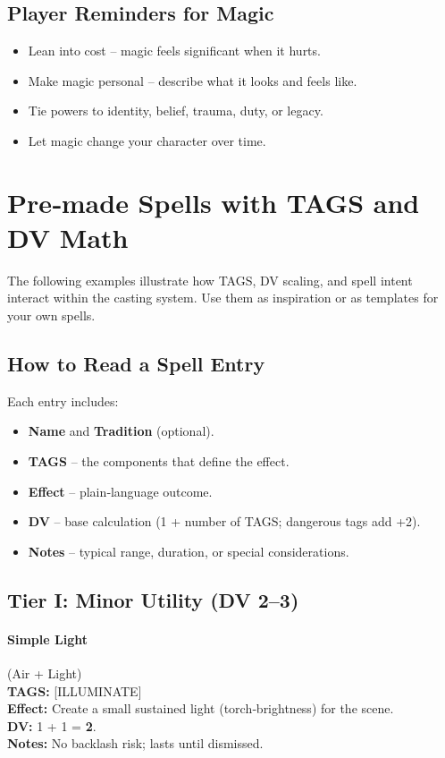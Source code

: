 \subsection{Player Reminders for Magic}
\begin{itemize}
    \item Lean into cost -- magic feels significant when it hurts.
    \item Make magic personal -- describe what it looks and feels like.
    \item Tie powers to identity, belief, trauma, duty, or legacy.
    \item Let magic change your character over time.
\end{itemize}

\clearpage

\section{Pre‑made Spells with TAGS and DV Math}
\label{app:spell-examples}

The following examples illustrate how TAGS, DV scaling, and spell intent interact within the casting system. Use them as inspiration or as templates for your own spells.

\subsection{How to Read a Spell Entry}
Each entry includes:
\begin{itemize}
  \item \textbf{Name} and \textbf{Tradition} (optional).
  \item \textbf{TAGS} -- the components that define the effect.
  \item \textbf{Effect} -- plain‑language outcome.
  \item \textbf{DV} -- base calculation (1 + number of TAGS; dangerous tags add +2).
  \item \textbf{Notes} -- typical range, duration, or special considerations.
\end{itemize}

\subsection{Tier I: Minor Utility (DV 2--3)}

\paragraph{Simple Light} (Air + Light) \\
\textbf{TAGS:} {[ILLUMINATE]} \\
\textbf{Effect:} Create a small sustained light (torch‑brightness) for the scene. \\
\textbf{DV:} 1 + 1 = \textbf{2}. \\
\textbf{Notes:} No backlash risk; lasts until dismissed.

